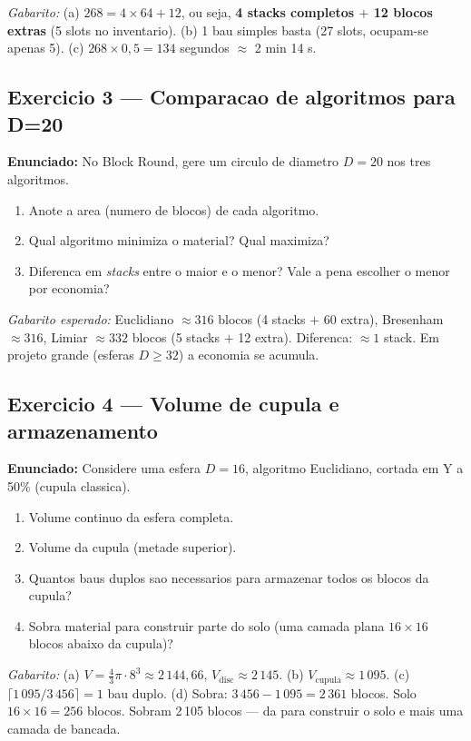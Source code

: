 \documentclass[12pt,a4paper]{scrartcl}
\newcommand{\acc}[1]{\textcolor{accent}{\textbf{#1}}}
\begin{document}
\emph{Gabarito:} (a) $268 = 4 \times 64 + 12$, ou seja, \acc{4 stacks completos $+$ 12 blocos extras} (5 slots no inventario). (b) 1 bau simples basta (27 slots, ocupam-se apenas 5). (c) $268 \times 0{,}5 = 134$ segundos $\approx$ 2 min 14 s.

\subsection*{Exercicio 3 --- Comparacao de algoritmos para D=20}
\textbf{Enunciado:} No Block Round, gere um circulo de diametro $D = 20$ nos tres algoritmos.
\begin{enumerate}[label=\alph*),leftmargin=1.5em,itemsep=0.1em,topsep=0.2em,nosep]
  \item Anote a area (numero de blocos) de cada algoritmo.
  \item Qual algoritmo minimiza o material? Qual maximiza?
  \item Diferenca em \emph{stacks} entre o maior e o menor? Vale a pena escolher o menor por economia?
\end{enumerate}

\emph{Gabarito esperado:} Euclidiano $\approx 316$ blocos (4 stacks $+$ 60 extra), Bresenham $\approx 316$, Limiar $\approx 332$ blocos (5 stacks $+$ 12 extra). Diferenca: $\approx 1$ stack. Em projeto grande (esferas $D \geq 32$) a economia se acumula.

\subsection*{Exercicio 4 --- Volume de cupula e armazenamento}
\textbf{Enunciado:} Considere uma esfera $D = 16$, algoritmo Euclidiano, cortada em Y a 50\% (cupula classica).
\begin{enumerate}[label=\alph*),leftmargin=1.5em,itemsep=0.1em,topsep=0.2em,nosep]
  \item Volume continuo da esfera completa.
  \item Volume da cupula (metade superior).
  \item Quantos baus duplos sao necessarios para armazenar todos os blocos da cupula?
  \item Sobra material para construir parte do solo (uma camada plana $16 \times 16$ blocos abaixo da cupula)?
\end{enumerate}

\emph{Gabarito:}
(a) $V = \tfrac{4}{3}\pi \cdot 8^3 \approx 2\,144{,}66$, $V_{\mathrm{disc}} \approx 2\,145$. (b) $V_{\mathrm{cupula}} \approx 1\,095$. (c) $\lceil 1\,095 / 3\,456 \rceil = 1$ bau duplo. (d) Sobra: $3\,456 - 1\,095 = 2\,361$ blocos. Solo $16 \times 16 = 256$ blocos. Sobram 2\,105 blocos --- da para construir o solo e mais uma camada de bancada.
\end{document}
